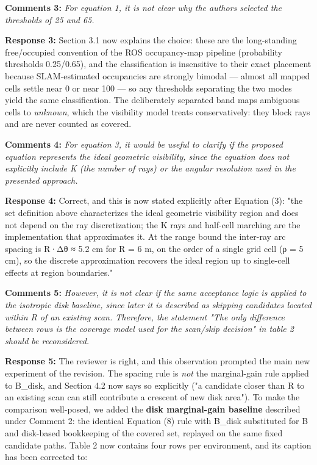 \documentclass[11pt]{article}
\begin{document}
\medskip

\textbf{Comments 3:} \emph{\emph{For equation 1, it is not clear why the authors selected the thresholds of 25 and 65.}}

\textbf{Response 3:} Section 3.1 now explains the choice: these are the long-standing free/occupied convention of the ROS occupancy-map pipeline (probability thresholds 0.25/0.65), and the classification is insensitive to their exact placement because SLAM-estimated occupancies are strongly bimodal — almost all mapped cells settle near 0 or near 100 — so any thresholds separating the two modes yield the same classification. The deliberately separated band maps ambiguous cells to \emph{unknown}, which the visibility model treats conservatively: they block rays and are never counted as covered.

\medskip

\textbf{Comments 4:} \emph{\emph{For equation 3, it would be useful to clarify if the proposed equation represents the ideal geometric visibility, since the equation does not explicitly include K (the number of rays) or the angular resolution used in the presented approach.}}

\textbf{Response 4:} Correct, and this is now stated explicitly after Equation (3): "the set definition above characterizes the ideal geometric visibility region and does not depend on the ray discretization; the K rays and half-cell marching are the implementation that approximates it. At the range bound the inter-ray arc spacing is R·Δθ ≈ 5.2 cm for R = 6 m, on the order of a single grid cell (ρ = 5 cm), so the discrete approximation recovers the ideal region up to single-cell effects at region boundaries."

\medskip

\textbf{Comments 5:} \emph{\emph{However, it is not clear if the same acceptance logic is applied to the isotropic disk baseline, since later it is described as skipping candidates located within R of an existing scan. Therefore, the statement "The only difference between rows is the coverage model used for the scan/skip decision" in table 2 should be reconsidered.}}

\textbf{Response 5:} The reviewer is right, and this observation prompted the main new experiment of the revision. The spacing rule is \emph{not} the marginal-gain rule applied to B\_disk, and Section 4.2 now says so explicitly ("a candidate closer than R to an existing scan can still contribute a crescent of new disk area"). To make the comparison well-posed, we added the \textbf{disk marginal-gain baseline} described under Comment 2: the identical Equation (8) rule with B\_disk substituted for B and disk-based bookkeeping of the covered set, replayed on the same fixed candidate paths. Table 2 now contains four rows per environment, and its caption has been corrected to:
\end{document}
